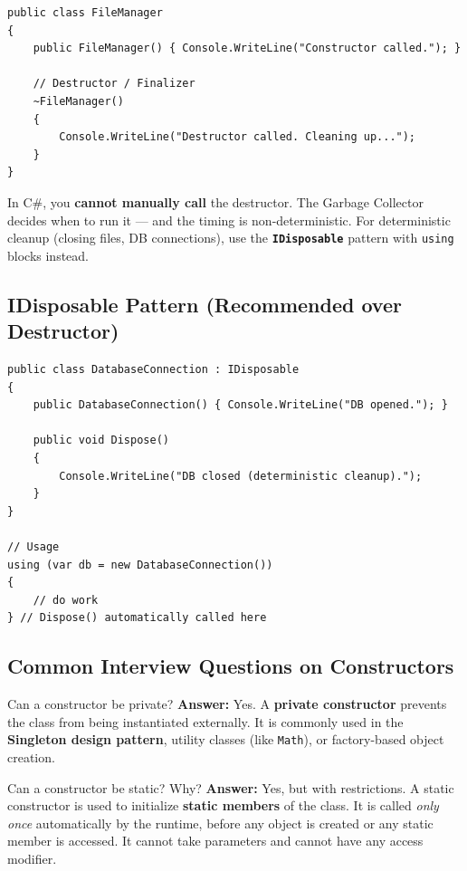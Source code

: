 \documentclass[11pt,a4paper]{article}
\begin{document}
\begin{lstlisting}[caption={Destructor in C\#}]
public class FileManager
{
    public FileManager() { Console.WriteLine("Constructor called."); }

    // Destructor / Finalizer
    ~FileManager()
    {
        Console.WriteLine("Destructor called. Cleaning up...");
    }
}
\end{lstlisting}

\begin{gotchaBox}
In C\#, you \textbf{cannot manually call} the destructor. The Garbage Collector decides when to run it — and the timing is non-deterministic. For deterministic cleanup (closing files, DB connections), use the \textbf{\texttt{IDisposable}} pattern with \texttt{using} blocks instead.
\end{gotchaBox}

\subsection{IDisposable Pattern (Recommended over Destructor)}

\begin{lstlisting}[caption={IDisposable pattern}]
public class DatabaseConnection : IDisposable
{
    public DatabaseConnection() { Console.WriteLine("DB opened."); }

    public void Dispose()
    {
        Console.WriteLine("DB closed (deterministic cleanup).");
    }
}

// Usage
using (var db = new DatabaseConnection())
{
    // do work
} // Dispose() automatically called here
\end{lstlisting}

\subsection{Common Interview Questions on Constructors}

\begin{intqBox}{Can a constructor be private?}
\textbf{Answer:} Yes. A \textbf{private constructor} prevents the class from being instantiated externally. It is commonly used in the \textbf{Singleton design pattern}, utility classes (like \texttt{Math}), or factory-based object creation.
\end{intqBox}

\begin{intqBox}{Can a constructor be static? Why?}
\textbf{Answer:} Yes, but with restrictions. A static constructor is used to initialize \textbf{static members} of the class. It is called \textit{only once} automatically by the runtime, before any object is created or any static member is accessed. It cannot take parameters and cannot have any access modifier.
\end{intqBox}
\end{document}

